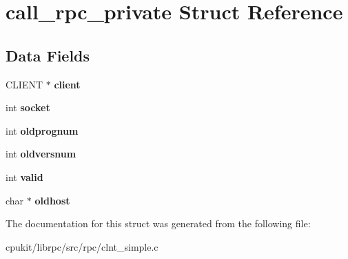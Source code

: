 \hypertarget{structcall__rpc__private}{}\section{call\+\_\+rpc\+\_\+private Struct Reference}
\label{structcall__rpc__private}
\subsection*{Data Fields}
\begin{DoxyCompactItemize}
\item 
\mbox{\label{structcall__rpc__private_a42996d0853d3d7646e0db2bca658e5ad}} 
C\+L\+I\+E\+NT $\ast$ {\bfseries client}
\item 
\mbox{\label{structcall__rpc__private_a093f9c9ad4b4ca9248f430b685c4a267}} 
int {\bfseries socket}
\item 
\mbox{\label{structcall__rpc__private_a13b86dba4c1cd4384659061ffe648f8a}} 
int {\bfseries oldprognum}
\item 
\mbox{\label{structcall__rpc__private_a5f32c281eaa20c82198478111a112fd6}} 
int {\bfseries oldversnum}
\item 
\mbox{\label{structcall__rpc__private_a450f534428bf5417477649e7b479aa78}} 
int {\bfseries valid}
\item 
\mbox{\label{structcall__rpc__private_a7c9de3d9ba467572f1a0af84b3410041}} 
char $\ast$ {\bfseries oldhost}
\end{DoxyCompactItemize}


The documentation for this struct was generated from the following file\+:\begin{DoxyCompactItemize}
\item 
cpukit/librpc/src/rpc/clnt\+\_\+simple.\+c\end{DoxyCompactItemize}
